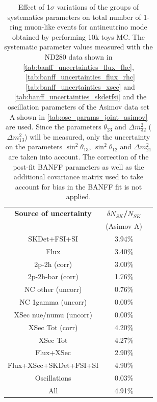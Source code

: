 \begin{table}[htb]
\centering
\begin{tabular}{| c | c | c |}
\hline
  {\bf Source of uncertainty}    & \multicolumn{1}{c|}{{\bf ${\delta}N_{SK}$/$N_{SK}$}}\\
                                 & \multicolumn{1}{c|}{(Asimov A)}\\

\hline
\hline  SKDet+FSI+SI                   & 3.94\%                        \\
\hline
\hline
  Flux                           & 3.40\%                        \\
\hline
\hline
  2p-2h (corr)                     & 3.00\%                        \\
  2p-2h-bar (corr)                  & 1.76\%                        \\
  NC other (uncorr)              & 0.76\%                        \\
  NC 1gamma (uncorr)             & 0.00\%                        \\
  XSec nue/numu (uncorr)                 & 0.00\%                        \\
\hline  
  XSec Tot (corr)                  & 4.20\%                        \\
  XSec Tot                       & 4.27\%                        \\
\hline
\hline
  Flux+XSec                      & 2.90\%                        \\
\hline
\hline
  Flux+XSec+SKDet+FSI+SI         & 4.90\%                        \\
\hline
\hline
  Oscillations                   & 0.03\%                        \\
\hline
\hline
  All                            & 4.91\%                        \\
\hline
\hline

\end{tabular}

\caption{
 Effect of 1$\sigma$ variations of the groups of systematics parameters on total number of
 1-ring muon-like events for antineutrino mode obtained by performing 10k toys MC.
The systematic parameter values measured with the ND280 data 
shown in 
\cref{tab:banff_uncertainties_flux_fhc},
~\ref{tab:banff_uncertainties_flux_rhc}
~\ref{tab:banff_uncertainties_xsec}
and
~\ref{tab:banff_uncertainties_skdetfsi}
and the oscillation parameters of the Asimov data set A shown in \cref{tab:osc_params_joint_asimov}
are used.
Since the parameters $\theta_{23}$ and $\Delta m^2_{32}$ ($\Delta m^2_{13}$)
will be measured,
only the uncertainty on the parameters 
$\sin^2 \theta_{13}$,
$\sin^2 \theta_{12}$
and 
$\Delta m^2_{21}$ 
are taken into account.
The correction of the post-fit BANFF parameters as well as the additional covariance matrix 
used to take account for bias in the BANFF fit is not applied.
}                                                                                                                                                                                          
\label{tab:nsk_systematic_table_summary_joint_asimov_A_rhc_mulike_NoFluxBias}
\end{table}

